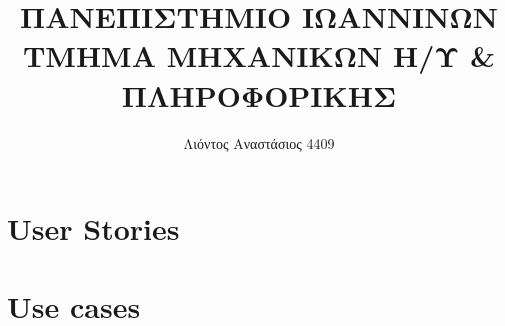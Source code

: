 \documentclass{article}[40pt]
\title{ΠΑΝΕΠΙΣΤΗΜΙΟ ΙΩΑΝΝΙΝΩΝ \\ ΤΜΗΜΑ ΜΗΧΑΝΙΚΩΝ Η/Υ  \&  ΠΛΗΡΟΦΟΡΙΚΗΣ}
\author{Λιόντος Αναστάσιος 4409}
\begin{document}
\maketitle
\newpage
\tableofcontents
\newpage
\section{User Stories}

\section{Use cases}


\end{document}
